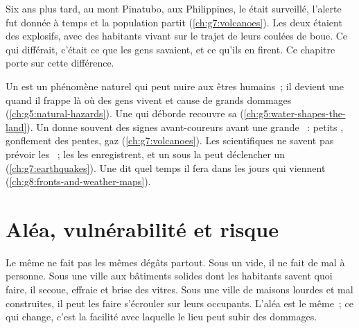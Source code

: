 Six ans plus tard, au mont Pinatubo, aux Philippines, le  était
surveillé, l'alerte fut donnée à temps et la population partit
(\cref{ch:g7:volcanoes}). Les deux étaient des  explosifs, avec des
habitants vivant sur le trajet de leurs coulées de boue. Ce qui différait,
c'était ce que les gens savaient, et ce qu'ils en firent. Ce chapitre
porte sur cette différence.

\begin{recall}
Un \emph{} est un phénomène naturel qui peut nuire aux
êtres humains~; il devient une \emph{} quand il
frappe là où des gens vivent et cause de grands dommages
(\cref{ch:g5:natural-hazards}). Une  qui déborde recouvre sa  (\cref{ch:g5:water-shapes-the-land}). Un  donne souvent
des signes avant-coureurs avant une grande ~: petits ,
gonflement des pentes, gaz (\cref{ch:g7:volcanoes}). Les scientifiques ne
savent pas prévoir les ~; les  les enregistrent, et un
 sous la  peut déclencher un  (\cref{ch:g7:earthquakes}).
Une  dit quel temps il fera dans les jours qui
viennent (\cref{ch:g8:fronts-and-weather-maps}).
\end{recall}

\section{Aléa, vulnérabilité et risque}

Le même  ne fait pas les mêmes dégâts partout. Sous un  vide,
il ne fait de mal à personne. Sous une ville aux bâtiments solides dont
les habitants savent quoi faire, il secoue, effraie et brise des vitres.
Sous une ville de maisons lourdes et mal construites, il peut les faire
s'écrouler sur leurs occupants. L'aléa est le même~; ce qui change, c'est
la facilité avec laquelle le lieu peut subir des dommages.

